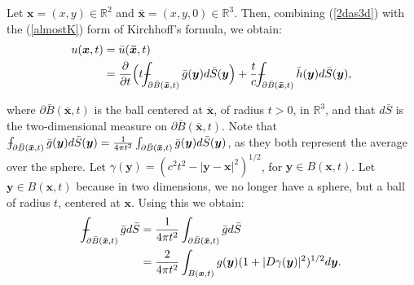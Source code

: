 \documentclass[a4paper, 12pt]{article}
\def\Xint#1{\mathchoice
{\XXint\displaystyle\textstyle{#1}}%
{\XXint\textstyle\scriptstyle{#1}}%
{\XXint\scriptstyle\scriptscriptstyle{#1}}%
{\XXint\scriptscriptstyle\scriptscriptstyle{#1}}%
\!\int}
\def\XXint#1#2#3{{\setbox0=\hbox{$#1{#2#3}{\int}$ }
\vcenter{\hbox{$#2#3$ }}\kern-.6\wd0}}
\def\dashint{\Xint-}
\numberwithin{equation}{section}
\begin{document}
Let $\boldsymbol{x}=(x,y)\in \mathbb{R}^2$ and $\boldsymbol{\bar{x}}=(x,y, 0)\in
\mathbb{R}^3$. Then, combining (\ref{2das3d}) with the (\ref{almostK}) form of
Kirchhoff's formula, we obtain:
\begin{equation} \label{star}
    \begin{aligned}
        u(\boldsymbol{x},t)&=\bar{u}(\boldsymbol{\bar{x}}, t)\\
        &=\diffp[1]{}{t}\Big(t\dashint_{\partial \bar{B}(\boldsymbol{\bar{x}}, t)} \bar{g}(\boldsymbol{y}) d\bar{S}(\boldsymbol{y}\Big)+\frac{t}{c} \dashint_{\partial \bar{B}(\boldsymbol{\bar{x}}, t)} \bar{h}(\boldsymbol{y})d\bar{S}(\boldsymbol{y}),
    \end{aligned}
\end{equation}

where $\partial\bar{B}(\boldsymbol{\bar{x}},t)$ is the ball centered at
$\boldsymbol{\bar{x}}$, of radius $t>0$, in $\mathbb{R}^3$, and that $d\bar{S}$
is the two-dimensional measure on $\partial\bar{B}(\boldsymbol{\bar{x}},t)$.
Note that $\dashint_{\partial \bar{B}(\boldsymbol{\bar{x}}, t)}
\bar{g}(\boldsymbol{y}) d\bar{S}(\boldsymbol{y})=\frac{1}{4\pi
t^2}\int_{\partial \bar{B}(\boldsymbol{\bar{x}}, t)}\bar{g} (\boldsymbol{y})
d\bar{S} (\boldsymbol{y})$, as they both represent the average over the sphere.
Let $\gamma (\boldsymbol{y})=(c^2 t^2-|\boldsymbol{y}-\boldsymbol{x}|^2)^{1/2}$,
for $\boldsymbol{y} \in B(\boldsymbol{x}, t)$. Let $\boldsymbol{y} \in
B(\boldsymbol{x}, t)$ because in two dimensions, we no longer have a sphere, but
a ball of radius $t$, centered at $\boldsymbol{x}$. Using this we obtain:
\begin{equation} \label{tired}
    \begin{aligned}
        \dashint_{\partial \bar{B}(\boldsymbol{\bar{x}}, t)} \bar{g} d\bar{S}&=\frac{1}{4\pi t^2}\int_{\partial \bar{B}(\boldsymbol{\bar{x}}, t)}\bar{g} d\bar{S}\\
        &=\frac{2}{4 \pi t^2} \int_{B(\boldsymbol{x}, t)} g(\boldsymbol{y})(1+|D\gamma (\boldsymbol{y})|^2)^{1/2}d\boldsymbol{y}.
    \end{aligned}
\end{equation}
\end{document}
